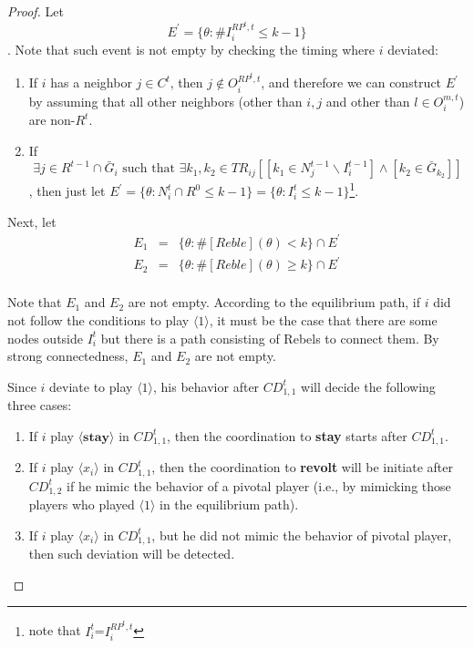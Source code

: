 \documentclass[12pt,letter]{article}
\theoremstyle{definition}
\theoremstyle{remark}
\theoremstyle{claim}
\begin{document}
\begin{proof}


Let
\[E^{'}=\{\theta:\#I^{RP^t,t}_i\leq k-1\}\]
. Note that such event is not empty by checking the timing where $i$ deviated:
\begin{enumerate}
\item If $i$ has a neighbor $j\in C^t$, then $j\not\in O^{RP^t,t}_i$, and therefore we can construct $E^{'}$ by assuming that all other neighbors (other than $i,j$ and other than $l\in O^{m,t}_i$) are non-$R^t$.
\item If \[\exists j\in R^{t-1}\cap \bar{G}_i \text{ such that } \exists k_1,k_2\in TR_{ij}[[k_1\in N^{t-1}_j\backslash I^{t-1}_i] \wedge [k_2\in \bar{G}_{k_2}]]\], then just let $E^{'}=\{\theta: N^t_i\cap R^0\leq k-1\}=\{\theta: I^t_i\leq k-1\}$\footnote{note that $I^t_i$=$I^{RP^t,t}_i$}.
\end{enumerate}

Next, let 
\begin{eqnarray*}
E_1&=&\{\theta: \#[Reble](\theta)<k\}\cap E^{'}\\
E_2&=&\{\theta: \#[Reble](\theta)\geq k\}\cap E^{'}\\
\end{eqnarray*}

Note that $E_1$ and $E_2$ are not empty. According to the equilibrium path, if $i$ did not follow the conditions to play $\langle 1 \rangle$, it must be the case that there are some nodes outside $I^t_i$ but there is a path consisting of Rebels to connect them. By strong connectedness, $E_1$ and $E_2$ are not empty.

Since $i$ deviate to play $\langle 1 \rangle$, his behavior after $CD^t_{1,1}$ will decide the following three cases:
\begin{enumerate}
\item If $i$ play $\langle \textbf{stay} \rangle$ in $CD^t_{1,1}$, then the coordination to \textbf{stay} starts after $CD^t_{1,1}$.
\item If $i$ play $\langle x_i \rangle$ in $CD^t_{1,1}$, then the coordination to \textbf{revolt} will be initiate after $CD^t_{1,2}$ if he mimic the behavior of a pivotal player (i.e., by mimicking those players who played $\langle 1 \rangle$ in the equilibrium path).
\item If $i$ play $\langle x_i \rangle$ in $CD^t_{1,1}$, but he did not mimic the behavior of pivotal player, then such deviation will be detected.
\end{enumerate}


\end{proof}
\end{document}
